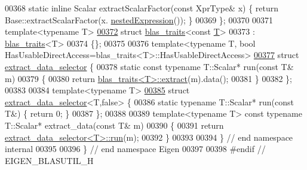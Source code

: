 \begin{DoxyCode}
00368   \textcolor{keyword}{static} \textcolor{keyword}{inline} Scalar extractScalarFactor(\textcolor{keyword}{const} XprType& x) \{ \textcolor{keywordflow}{return} Base::extractScalarFactor(x.
      \hyperlink{group___core___module_a72aefbf67f5e3caf62a99f73409b4a63}{nestedExpression}()); \}
00369 \};
00370 
00371 \textcolor{keyword}{template}<\textcolor{keyword}{typename} T>
\hyperlink{struct_eigen_1_1internal_1_1blas__traits_3_01const_01_t_01_4}{00372} \textcolor{keyword}{struct }\hyperlink{struct_eigen_1_1internal_1_1blas__traits}{blas\_traits}<const \hyperlink{group___sparse_core___module}{T}>
00373      : \hyperlink{struct_eigen_1_1internal_1_1blas__traits}{blas\_traits}<T>
00374 \{\};
00375 
00376 template<typename T, bool HasUsableDirectAccess=blas\_traits<T>::HasUsableDirectAccess>
\hyperlink{struct_eigen_1_1internal_1_1extract__data__selector}{00377} \textcolor{keyword}{struct }\hyperlink{struct_eigen_1_1internal_1_1extract__data__selector}{extract\_data\_selector} \{
00378   \textcolor{keyword}{static} \textcolor{keyword}{const} \textcolor{keyword}{typename} T::Scalar* run(\textcolor{keyword}{const} T& m)
00379   \{
00380     \textcolor{keywordflow}{return} \hyperlink{struct_eigen_1_1internal_1_1blas__traits}{blas\_traits<T>::extract}(m).data();
00381   \}
00382 \};
00383 
00384 \textcolor{keyword}{template}<\textcolor{keyword}{typename} T>
\hyperlink{struct_eigen_1_1internal_1_1extract__data__selector_3_01_t_00_01false_01_4}{00385} \textcolor{keyword}{struct }\hyperlink{struct_eigen_1_1internal_1_1extract__data__selector}{extract\_data\_selector}<T,false> \{
00386   \textcolor{keyword}{static} \textcolor{keyword}{typename} T::Scalar* run(\textcolor{keyword}{const} T&) \{ \textcolor{keywordflow}{return} 0; \}
00387 \};
00388 
00389 \textcolor{keyword}{template}<\textcolor{keyword}{typename} T> \textcolor{keyword}{const} \textcolor{keyword}{typename} T::Scalar* extract\_data(\textcolor{keyword}{const} T& m)
00390 \{
00391   \textcolor{keywordflow}{return} \hyperlink{struct_eigen_1_1internal_1_1extract__data__selector}{extract\_data\_selector<T>::run}(m);
00392 \}
00393 
00394 \} \textcolor{comment}{// end namespace internal}
00395 
00396 \} \textcolor{comment}{// end namespace Eigen}
00397 
00398 \textcolor{preprocessor}{#endif // EIGEN\_BLASUTIL\_H}
\end{DoxyCode}
